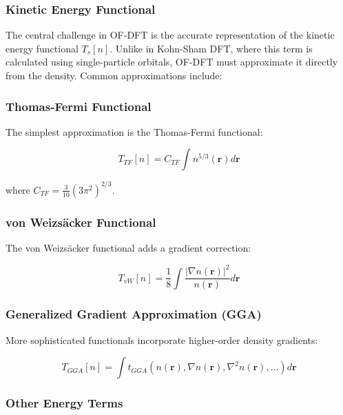 \subsubsection{Kinetic Energy Functional}

The central challenge in OF-DFT is the accurate representation of the kinetic energy functional $T_s[n]$. Unlike in Kohn-Sham DFT, where this term is calculated using single-particle orbitals, OF-DFT must approximate it directly from the density. Common approximations include:

\subsubsection{Thomas-Fermi Functional}

The simplest approximation is the Thomas-Fermi functional:

\begin{equation}
T_{TF}[n] = C_{TF} \int n^{5/3}(\mathbf{r}) d\mathbf{r}
\end{equation}

where $C_{TF} = \frac{3}{10}(3\pi^2)^{2/3}$.

\subsubsection{von Weizsäcker Functional}

The von Weizsäcker functional adds a gradient correction:

\begin{equation}
T_{vW}[n] = \frac{1}{8} \int \frac{|\nabla n(\mathbf{r})|^2}{n(\mathbf{r})} d\mathbf{r}
\end{equation}

\subsubsection{Generalized Gradient Approximation (GGA)}

More sophisticated functionals incorporate higher-order density gradients:

\begin{equation}
T_{GGA}[n] = \int t_{GGA}(n(\mathbf{r}), \nabla n(\mathbf{r}), \nabla^2 n(\mathbf{r}), ...) d\mathbf{r}
\end{equation}

\subsubsection{Other Energy Terms}

